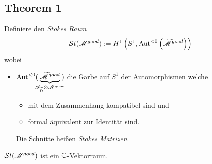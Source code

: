 
\pagebreak \subsection{Theorem 1} %
\begin{comment}
  see:
  \begin{itemize}
    \item \cite[29]{Varadarajan96linearmeromorphic}
  \end{itemize}
\end{comment}
\begin{defn}
  Definiere den \emph{Stokes Raum}
  \[
    \mathcal{S}{}t(\mathscr{M}^{good})
      :=H^1\left(S^1,\operatorname{Aut}^{<0}\left(\widetilde {\mathscr{M}}^{good}\right)\right)
  \]
  wobei
  \begin{itemize}
    \item $\operatorname{Aut}^{<0}(\!\!\!\underset{\mathscr{A}_{\widetilde D}\otimes\mathscr{M}^{good}}
      {\underbrace{\widetilde{\mathscr{M}}^{good}}}\!\!\!)$
      die Garbe auf $S^1$ der Automorphismen welche
      \begin{itemize}
        \item mit dem Zusammenhang kompatibel sind und
        \item formal äquivalent zur Identität sind.
      \end{itemize}
      Die Schnitte heißen \emph{Stokes Matrizen}.
  \end{itemize}
  \begin{thm}
    $\mathcal{S}{}t(\mathscr{M}^{good})$ ist ein $\mathbb{C}$-Vektorraum.
  \end{thm}
\end{defn}

